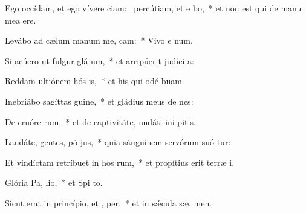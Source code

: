 \item Ego occídam, et ego vívere ciam:~\pscross{} percútiam, et e bo,~* et non est qui de manu mea  ere.
\item Levábo ad cælum manum me,  cam:~* Vivo e  num.
\item Si acúero ut fulgur glá um,~* et arripúerit judíci  a:
\item Reddam ultiónem hós is,~* et his qui odé  buam.
\item Inebriábo sagíttas  guine,~* et gládius meus de nes:
\item De cruóre rum,~* et de captivitáte, nudáti ini pitis.
\item Laudáte, gentes, pó jus,~* quia sánguinem servórum suó tur:
\item Et vindíctam retríbuet in hos rum,~* et propítius erit terræ  i.
\item \singlecolsep
\item Glória Pa,  lio,~* et Spi to.
\item Sicut erat in princípio, et ,  per,~* et in sǽcula sæ. men.
